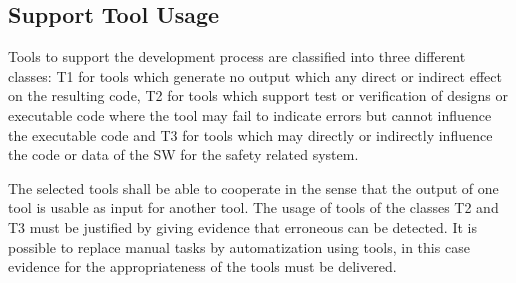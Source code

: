 \subsection{Support Tool Usage}
\label{sec:tool-usage}

Tools to support the development process are classified into three different
classes: T1 for tools which generate no output which any direct or indirect
effect on the resulting code, T2 for tools which support test or verification of
designs or executable code where the tool may fail to indicate errors but cannot
influence the executable code and T3 for tools which may directly or indirectly
influence the code or data of the SW for the safety related system.

The selected tools shall be able to cooperate in the sense that the output of
one tool is usable as input for another tool. The usage of tools of the classes
T2 and T3 must be justified by giving evidence that erroneous can be
detected. It is possible to replace manual tasks by automatization using tools,
in this case evidence for the appropriateness of the tools must be delivered.


